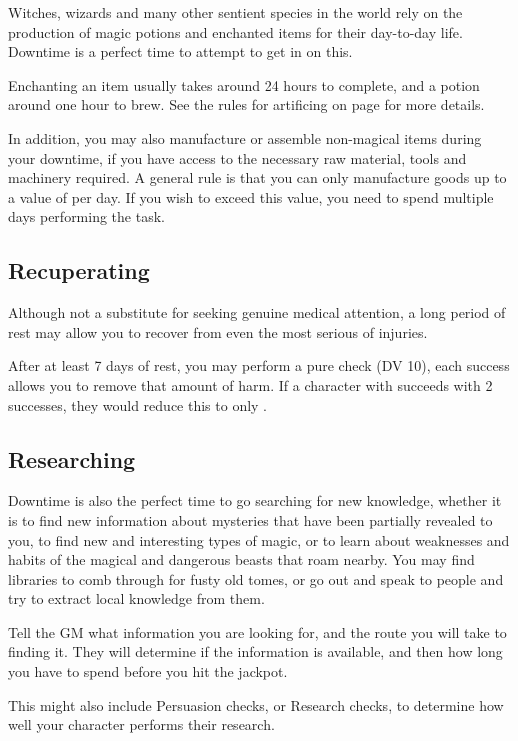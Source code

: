 Witches, wizards and many other sentient species in the world rely on the production of magic potions and enchanted items for their day-to-day life. Downtime is a perfect time to attempt to get in on this. 

Enchanting an item usually takes around 24 hours to complete, and a potion around one hour to brew. See the rules for artificing on page \pageref{S:Artificing} for more details. 

In addition, you may also manufacture or assemble non-magical items during your downtime, if you have access to the necessary raw material, tools and machinery required. A general rule is that you can only manufacture goods up to a value of  per day. If you wish to exceed this value, you need to spend multiple days performing the task.

\subsection{Recuperating}

Although not a substitute for seeking genuine medical attention, a long period of rest may allow you to recover from even the most serious of injuries. 

After at least 7 days of rest, you may perform a pure  check (DV 10), each success allows you to remove that amount of harm. If a character with  succeeds with 2 successes, they would reduce this to only .


\subsection{Researching}

Downtime is also the perfect time to go searching for new knowledge, whether it is to find new information about mysteries that have been partially revealed to you, to find new and interesting types of magic, or to learn about weaknesses and habits of the magical and dangerous beasts that roam nearby. You may find libraries to comb through for fusty old tomes, or go out and speak to people and try to extract local knowledge from them. 

Tell the GM what information you are looking for, and the route you will take to finding it. They will determine if the information is available, and then how long you have to spend before you hit the jackpot. 

This might also include Persuasion checks, or Research checks, to determine how well your character performs their research. 
 

